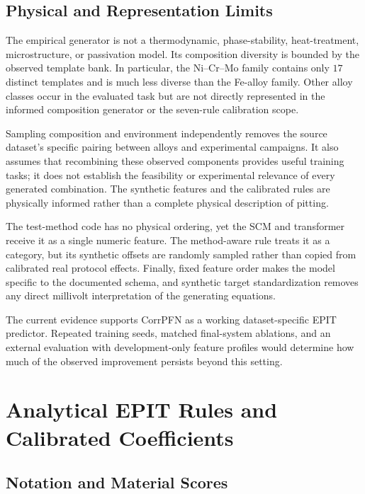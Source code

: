 \documentclass{article}
\begin{document}
\subsection{Physical and Representation Limits}

The empirical generator is not a thermodynamic, phase-stability,
heat-treatment, microstructure, or passivation model. Its composition
diversity is bounded by the observed template bank. In particular, the
Ni--Cr--Mo family contains only \(17\) distinct templates and is much less
diverse than the Fe-alloy family. Other alloy classes occur in the evaluated
task but are not directly represented in the informed composition generator
or the seven-rule calibration scope.

Sampling composition and environment independently removes the source
dataset's specific pairing between alloys and experimental campaigns. It
also assumes that recombining these observed components provides useful
training tasks; it does not establish the feasibility or experimental
relevance of every generated combination. The synthetic features and the
calibrated rules are physically informed rather than a complete physical
description of pitting.

The test-method code has no physical ordering, yet the SCM and transformer
receive it as a single numeric feature. The method-aware rule treats it as a
category, but its synthetic offsets are randomly sampled rather than copied
from calibrated real protocol effects. Finally, fixed feature order makes the
model specific to the documented schema, and synthetic target standardization
removes any direct millivolt interpretation of the generating equations.

The current evidence supports CorrPFN as a working dataset-specific EPIT
predictor. Repeated training seeds, matched final-system ablations, and an
external evaluation with development-only feature profiles would determine
how much of the observed improvement persists beyond this setting.

\appendix

\section{Analytical EPIT Rules and Calibrated Coefficients}
\label{app:target-rules}

\subsection{Notation and Material Scores}
\end{document}
